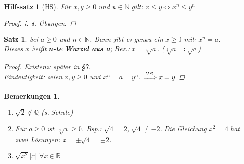 \documentclass[14pt,titlepage,ngerman,a4paper,headsepline,DIV15,halfparskip*]{scrartcl}
\newcommand{\N}{\mathbb{N}}
\newcommand{\Q}{\mathbb{Q}}
\newcommand{\R}{\mathbb{R}}
\theoremstyle{named}
\theoremstyle{dotless}
\newtheorem{satz}[namedtheorem]{Satz}
\newtheorem*{bemerkungen}{Bemerkungen}
\newtheorem*{hilfssatz*}{Hilfssatz}
\begin{document}
\begin{hilfssatz*}[HS]
	Für $x, y \geq 0$ und $n \in \N$ gilt: $x \leq y \iff x^{n} \leq y^{n}$	

	\begin{proof}
		i. d. Übungen.
	\end{proof}
\end{hilfssatz*}

\begin{satz} \label{1.6:satz}
	Sei $a \geq 0$ und $n \in \N$. Dann gibt es genau ein $x \geq 0$ mit: $x^{n} = a$. \\
	Dieses $x$ hei{\ss}t \textbf{n-te Wurzel aus a}; Bez.: $x = \sqrt[n]{a}$. ($\sqrt[2]{a} \eqqcolon \sqrt{a}$)
	
	\begin{proof}
		Existenz: später in \S 7. \\
		Eindeutigkeit: seien $x, y \geq 0$ und $x^{n} = a = y^{n}$. $\xRightarrow[]{HS} x = y$
	\end{proof}
\end{satz}


\begin{bemerkungen} \
	\begin{enumerate}
		\item $\sqrt{2} \notin \Q$ (s. Schule)
		\item Für $a \geq 0$ ist $\sqrt[n]{a} \geq 0$. Bsp.: $\sqrt{4} = 2$, $\sqrt{4} \neq - 2$. Die Gleichung $x^{2} = 4$ hat zwei Lösungen: $x = \pm \sqrt{4} = \pm 2$.
		\item $\sqrt{x^{2}} |x|$ $\forall x \in \R$
	\end{enumerate}
\end{bemerkungen}
\end{document}
